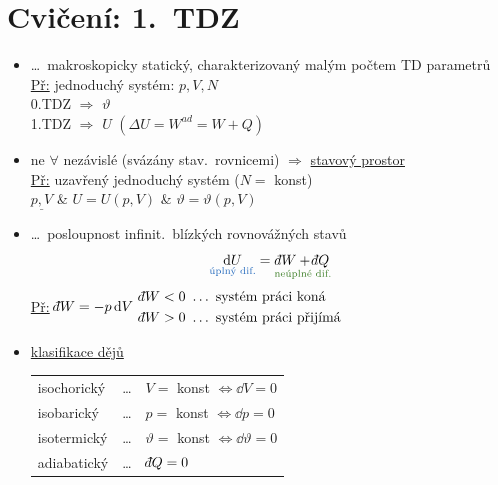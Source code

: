 \providecommand{\dbar}{{\mathchar'26\mkern-12mu d}}

\section{Cvičení: 1.\ TDZ}

\begin{itemize}
  \item {} \dots\ makroskopicky statický, charakterizovaný malým počtem TD parametrů \\
  \underline{Př:} jednoduchý systém: \quad $p, V, N$ \\
  \hspace*{2cm} 0.TDZ \quad $\Rightarrow$ \quad $\vartheta$ \\
  \hspace*{2cm} 1.TDZ \quad $\Rightarrow$ \quad $U$ \qquad $(\Delta U = W^{ad} = W + Q)$
  \item ne $\forall$ nezávislé (svázány stav.\ rovnicemi) $\Rightarrow$ \underline{stavový prostor} \\
  \underline{Př:} uzavřený jednoduchý systém ($N = $ konst) \\
  \hspace*{2cm} $\underline{p, V}$ \quad \& \quad $U = U(p,V)$ \quad \& \quad $\vartheta = \vartheta(p,V)$
  \item {} \dots\ posloupnost infinit.\ blízkých rovnovážných stavů
  \[
    \underset{\textcolor{NavyBlue}{\text{úplný dif.}}}{\dd U} = \underset{\textcolor{OliveGreen}{\text{neúplné dif.}}}{\dbar W + \dbar Q}
  \]
  \underline{Př:} \quad $\dbar W = -p\,\dd V$ \hfill
  $\begin{aligned}
    \dbar W < 0 &\ \dots\ \text{systém práci koná} \\
    \dbar W > 0 &\ \dots\ \text{systém práci přijímá}
  \end{aligned}$
  \item \underline{klasifikace dějů} \hfill
  \begin{tabular}[t]{lll}
    isochorický & \dots & $V = $ konst $\Leftrightarrow \dd V = 0$ \\
    isobarický & \dots & $p = $ konst $\Leftrightarrow \dd p = 0$ \\
    isotermický & \dots & $\vartheta = $ konst $\Leftrightarrow \dd\vartheta = 0$ \\
    adiabatický & \dots & $\dbar Q = 0$
  \end{tabular}
\end{itemize}

